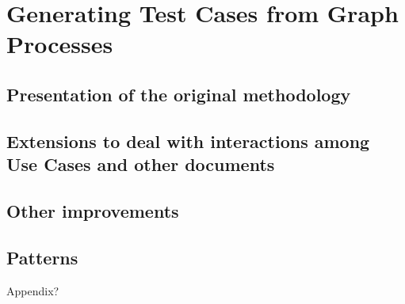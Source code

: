 \chapter{Generating Test Cases from Graph Processes}

\section{Presentation of the original methodology}

\section{Extensions to deal with interactions among Use Cases and other documents}

\section{Other improvements}

\section{Patterns}
Appendix?

\cite{Junior2015}

